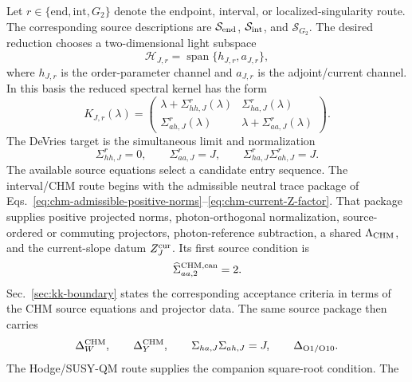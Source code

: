 Let \(r\in\{\mathrm{end},\mathrm{int},G_2\}\) denote the endpoint,
interval, or localized-singularity route.  The corresponding source
descriptions are \(\mathcal S_{\rm end}\), \(\mathcal S_{\rm int}\), and
\(\mathcal S_{G_2}\).
The desired reduction chooses a two-dimensional light subspace
\begin{equation}
  \mathcal H_{J,r}=\operatorname{span}\{h_{J,r},a_{J,r}\},
  \label{eq:route-light-space}
\end{equation}
where \(h_{J,r}\) is the order-parameter channel and \(a_{J,r}\) is the adjoint/current channel.  In this basis the reduced spectral kernel has the form
\begin{equation}
  K_{J,r}(\lambda)=
  \begin{pmatrix}
  \lambda+\Sigma_{hh,J}^{r}(\lambda) &
  \Sigma_{ha,J}^{r}(\lambda)\\
  \Sigma_{ah,J}^{r}(\lambda) &
  \lambda+\Sigma_{aa,J}^{r}(\lambda)
  \end{pmatrix}.
  \label{eq:route-common-kernel}
\end{equation}
The DeVries target is the simultaneous limit and normalization
\begin{equation}
  \Sigma_{hh,J}^{r}=0,\qquad
  \Sigma_{aa,J}^{r}=J,\qquad
  \Sigma_{ha,J}^{r}\Sigma_{ah,J}^{r}=J.
  \label{eq:route-common-target}
\end{equation}
The available source equations select a candidate entry sequence.  The
interval/CHM route begins with the admissible neutral trace package of
Eqs.~\eqref{eq:chm-admissible-positive-norms}--\eqref{eq:chm-current-Z-factor}.
That package supplies positive projected norms, photon-orthogonal
normalization, source-ordered or commuting projectors, photon-reference
subtraction, a shared \(\Lambda_{\rm CHM}\), and the current-slope datum
\(Z_J^{\rm cur}\).  Its first source condition is
\begin{equation}
  \widehat\Sigma_{aa,2}^{\rm CHM,can}=2 .
  \label{eq:route-chm-current-entry-first-test}
\end{equation}
Sec.~\ref{sec:kk-boundary} states the corresponding acceptance criteria in
terms of the CHM source equations and projector data.
The same source package then carries
\begin{equation}
  \Delta_W^{\rm CHM},\qquad
  \Delta_Y^{\rm CHM},\qquad
  \Sigma_{ha,J}\Sigma_{ah,J}=J,\qquad
  \Delta_{\rm O1/O10}.
  \label{eq:route-chm-followup-tests}
\end{equation}
The Hodge/SUSY-QM route supplies the companion square-root condition.  The
